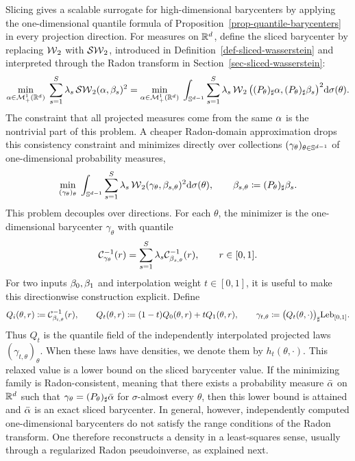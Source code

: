 Slicing gives a scalable surrogate for high-dimensional barycenters by applying the one-dimensional quantile formula of Proposition~\ref{prop-quantile-barycenters} in every projection direction. For measures on $\mathbb{R}^d$, define the sliced barycenter by replacing $\operatorname{\mathcal{W}}_2$ with $\operatorname{\mathcal{SW}}_2$, introduced in Definition~\ref{def-sliced-wasserstein} and interpreted through the Radon transform in Section~\ref{sec-sliced-wasserstein}:
\[
	\underset{\alpha\in\mathcal{M}_+^1(\mathbb{R}^d)}{\min}\;
	\sum_{s=1}^S\lambda_s\operatorname{\mathcal{SW}}_2(\alpha,\beta_s)^2
	=
	\underset{\alpha\in\mathcal{M}_+^1(\mathbb{R}^d)}{\min}\;
	\int_{\mathbb{S}^{d-1}}
	\sum_{s=1}^S\lambda_s
	\operatorname{\mathcal{W}}_2\big((P_\theta)_\sharp\alpha,(P_\theta)_\sharp\beta_s\big)^2
	\mathrm{d}\sigma(\theta).
\]
The constraint that all projected measures come from the same $\alpha$ is the nontrivial part of this problem. A cheaper Radon-domain approximation drops this consistency constraint and minimizes directly over collections $(\gamma_\theta)_{\theta\in\mathbb{S}^{d-1}}$ of one-dimensional probability measures,
\[
	\underset{(\gamma_\theta)_\theta}{\min}\;
	\int_{\mathbb{S}^{d-1}}
	\sum_{s=1}^S\lambda_s
	\operatorname{\mathcal{W}}_2(\gamma_\theta,\beta_{s,\theta})^2
	\mathrm{d}\sigma(\theta),
	\qquad
	\beta_{s,\theta}\coloneqq(P_\theta)_\sharp\beta_s.
\]
This problem decouples over directions. For each $\theta$, the minimizer is the one-dimensional barycenter $\gamma_\theta$ with quantile
\[
	\mathcal{C}_{\gamma_\theta}^{-1}(r)
	=
	\sum_{s=1}^S\lambda_s\mathcal{C}_{\beta_{s,\theta}}^{-1}(r),
	\qquad r\in[0,1].
\]
For two inputs $\beta_0,\beta_1$ and interpolation weight $t\in[0,1]$, it is useful to make this directionwise construction explicit. Define
\begin{equation}\label{eq-radon-barycenter-quantile-field}
	Q_i(\theta,r)
	\coloneqq
	\mathcal{C}_{\beta_{i,\theta}}^{-1}(r),
	\qquad
	Q_t(\theta,r)
	\coloneqq
	(1-t)Q_0(\theta,r)+tQ_1(\theta,r),
	\qquad
	\gamma_{t,\theta}
	\coloneqq
	\bigl(Q_t(\theta,\cdot)\bigr)_\sharp\mathrm{Leb}_{[0,1]}.
\end{equation}
Thus $Q_t$ is the quantile field of the independently interpolated projected laws $(\gamma_{t,\theta})_\theta$. When these laws have densities, we denote them by $h_t(\theta,\cdot)$.
This relaxed value is a lower bound on the sliced barycenter value. If the minimizing family is Radon-consistent, meaning that there exists a probability measure $\bar{\alpha}$ on $\mathbb{R}^d$ such that $\gamma_\theta=(P_\theta)_\sharp\bar{\alpha}$ for $\sigma$-almost every $\theta$, then this lower bound is attained and $\bar{\alpha}$ is an exact sliced barycenter. In general, however, independently computed one-dimensional barycenters do not satisfy the range conditions of the Radon transform. One therefore reconstructs a density in a least-squares sense, usually through a regularized Radon pseudoinverse, as explained next.


